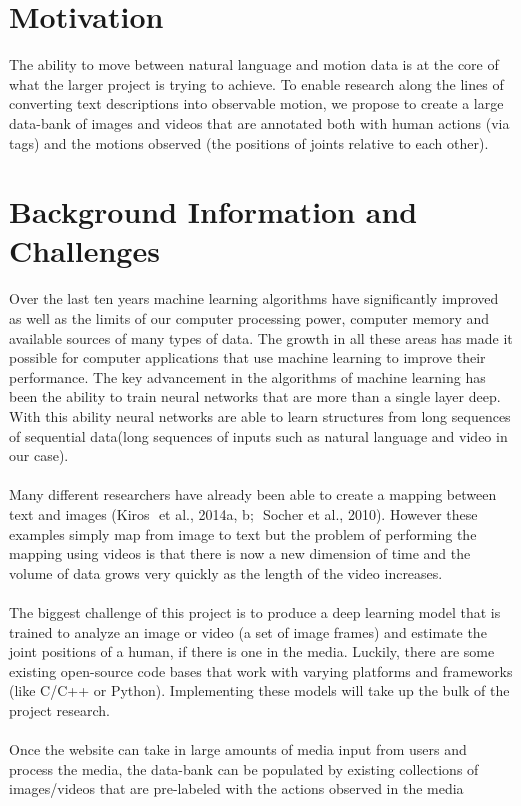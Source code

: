 \documentclass[a4paper, 12pt]{article}
\begin{document}
\section{Motivation} The ability to move between natural language and motion
data is at the core of what the larger project is trying to achieve. To enable
research along the lines of converting text descriptions into observable motion,
we propose to create a large data-bank of images and videos that are annotated
both with human actions (via tags) and the motions observed (the positions of
joints relative to each other).

\section{Background Information and Challenges} Over the last ten years machine
learning algorithms have significantly improved as well as the limits of our
computer processing power, computer memory and available sources of many types
of data. The growth in all these areas has made it possible for computer
applications that use machine learning to improve their performance. The key
advancement in the algorithms of machine learning has been the ability to train
neural networks that are more than a single layer deep. With this ability neural
networks are able to learn structures from long sequences of sequential
data(long sequences of inputs such as natural language and video in our case). \\ \\
Many different researchers have already been able to create a mapping between
text and images (Kiros ​ et al., 2014a, b; ​ Socher et al., 2010). However these
examples simply map from image to text but the problem of performing the mapping
using videos is that there is now a new dimension of time and the volume of data
grows very quickly as the length of the video increases. \\ \\ The biggest
challenge of this project is to produce a deep learning model that is trained to
analyze an image or video (a set of image frames) and estimate the joint
positions of a human, if there is one in the media. Luckily, there are some
existing open-source code bases that work with varying platforms and frameworks
(like C/C++ or Python). Implementing these models will take up the bulk of the
project research. \\ \\ Once the website can take in large amounts of media
input from users and process the media, the data-bank can be populated by
existing collections of images/videos that are pre-labeled with the actions
observed in the media
\end{document}
